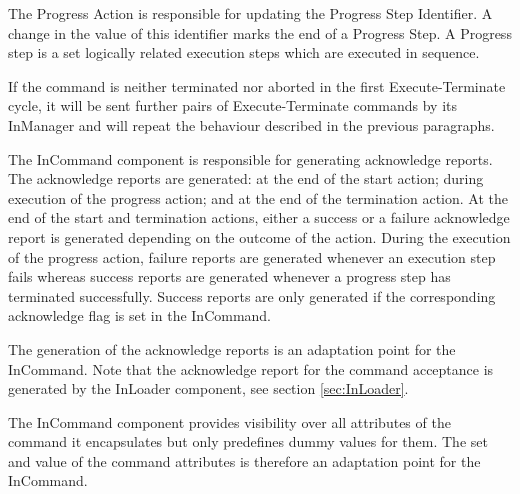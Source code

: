 The Progress Action is responsible for updating the Progress Step Identifier. A change in the value of this identifier marks the end of a Progress Step. A Progress step is a set logically related execution steps which are executed in sequence.

If the command is neither terminated nor aborted in the first Execute-Terminate cycle, it will be sent further pairs of Execute-Terminate commands by its InManager and will repeat the behaviour described in the previous paragraphs.  

The InCommand component is responsible for generating acknowledge reports. The acknowledge reports are generated: at the end of the start action; during execution of the progress action; and at the end of the termination action. At the end of the start and termination actions, either a success or a failure acknowledge report is generated depending on the outcome of the action. During the execution of the progress action, failure reports are generated whenever an execution step fails whereas success reports are generated whenever a progress step has terminated successfully. Success reports are only generated if the corresponding acknowledge flag is set in the InCommand. 

The generation of the acknowledge reports is an adaptation point for the InCommand. Note that the acknowledge report for the command acceptance is generated by the InLoader component, see section \ref{sec:InLoader}.

The InCommand component provides visibility over all attributes of the command it encapsulates but only predefines dummy values for them. The set and value of the command attributes is therefore an adaptation point for the InCommand.


